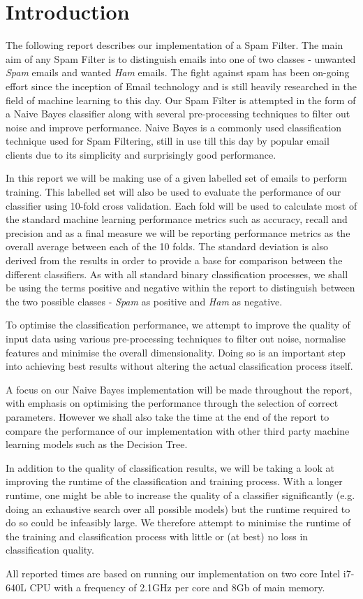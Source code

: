 \section{Introduction}
The following report describes our implementation of a Spam Filter. The main aim of any Spam Filter is to distinguish emails into one of two classes - unwanted \emph{Spam} emails and wanted \emph{Ham} emails. The fight against spam has been on-going effort since the inception of Email technology and is still heavily researched in the field of machine learning to this day. Our Spam Filter is attempted in the form of a Naive Bayes classifier along with several pre-processing techniques to filter out noise and improve performance. Naive Bayes is a commonly used classification technique used for Spam Filtering, still in use till this day by popular email clients due to its simplicity and surprisingly good performance.

In this report we will be making use of a given labelled set of emails to perform training. 
This labelled set will also be used to evaluate the performance of our classifier using 10-fold cross validation. 
Each fold will be used to calculate most of the standard machine learning performance metrics such as accuracy, recall and precision and as a final measure we will be reporting performance metrics as the overall average between each of the 10 folds. 
The standard deviation is also derived from the results in order to provide a base for comparison between the different classifiers.
As with all standard binary classification processes, we shall be using the terms positive and negative within the report to distinguish between the two possible classes - \emph{Spam} as positive and \emph{Ham} as negative.

To optimise the classification performance, we attempt to improve the quality of input data using various pre-processing techniques to filter out noise, normalise features and minimise the overall dimensionality. Doing so is an important step into achieving best results without altering the actual classification process itself.

A focus on our Naive Bayes implementation will be made throughout the report, with emphasis on optimising the performance through the selection of correct parameters.
However we shall also take the time at the end of the report to compare the performance of our implementation with other third party machine learning models such as the Decision Tree.

In addition to the quality of classification results, we will be taking a look at improving the runtime of the classification and training process.
With a longer runtime, one might be able to increase the quality of a classifier  significantly (e.g. doing an exhaustive search over all possible models) but the runtime required to do so could be infeasibly large. We therefore attempt to minimise the runtime of the training and classification process with little or (at best) no loss in classification quality.

All reported times are based on running our implementation on two core Intel i7-640L CPU with a frequency of 2.1GHz per core and 8Gb of main memory.

